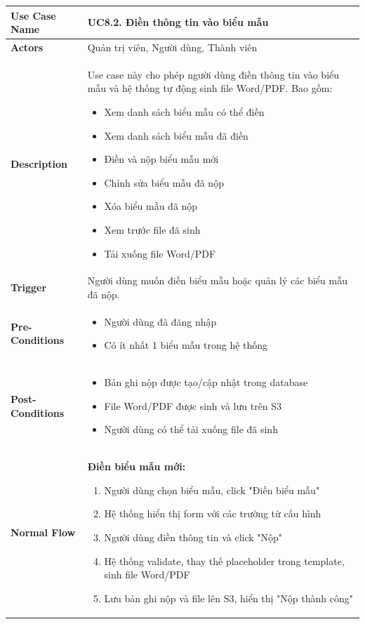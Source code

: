     \newpage
    \begin{table}[H]
    \renewcommand{\arraystretch}{1.3}
    \begin{tabular}{|m{}|m{}|}
    \hline
    \textbf{Use Case Name} 
    & \textbf{UC8.2. Điền thông tin vào biểu mẫu} \\ \hline

\textbf{Actors} 
& Quản trị viên, Người dùng, Thành viên \\ \hline

\textbf{Description} 
    & Use case này cho phép người dùng điền thông tin vào biểu mẫu và hệ thống tự động sinh file Word/PDF. Bao gồm:
    \begin{itemize}
        \item Xem danh sách biểu mẫu có thể điền
        \item Xem danh sách biểu mẫu đã điền
        \item Điền và nộp biểu mẫu mới
        \item Chỉnh sửa biểu mẫu đã nộp
        \item Xóa biểu mẫu đã nộp
        \item Xem trước file đã sinh
        \item Tải xuống file Word/PDF
    \end{itemize}
    \\ \hline

    \textbf{Trigger} 
    & Người dùng muốn điền biểu mẫu hoặc quản lý các biểu mẫu đã nộp.
    \\ \hline

    \textbf{Pre-Conditions} 
    & \begin{itemize}
        \item Người dùng đã đăng nhập
        \item Có ít nhất 1 biểu mẫu trong hệ thống
    \end{itemize}
    \\ \hline

    \textbf{Post-Conditions} 
    & \begin{itemize}
        \item Bản ghi nộp được tạo/cập nhật trong database
        \item File Word/PDF được sinh và lưu trên S3
        \item Người dùng có thể tải xuống file đã sinh
    \end{itemize}
    \\ \hline

    \textbf{Normal Flow} 
    & \textbf{Điền biểu mẫu mới:}
    \begin{enumerate}
        \item Người dùng chọn biểu mẫu, click "Điền biểu mẫu"
        \item Hệ thống hiển thị form với các trường từ cấu hình
        \item Người dùng điền thông tin và click "Nộp"
        \item Hệ thống validate, thay thế placeholder trong template, sinh file Word/PDF
        \item Lưu bản ghi nộp và file lên S3, hiển thị "Nộp thành công"
    \end{enumerate}


\end{tabular}
\end{table}
